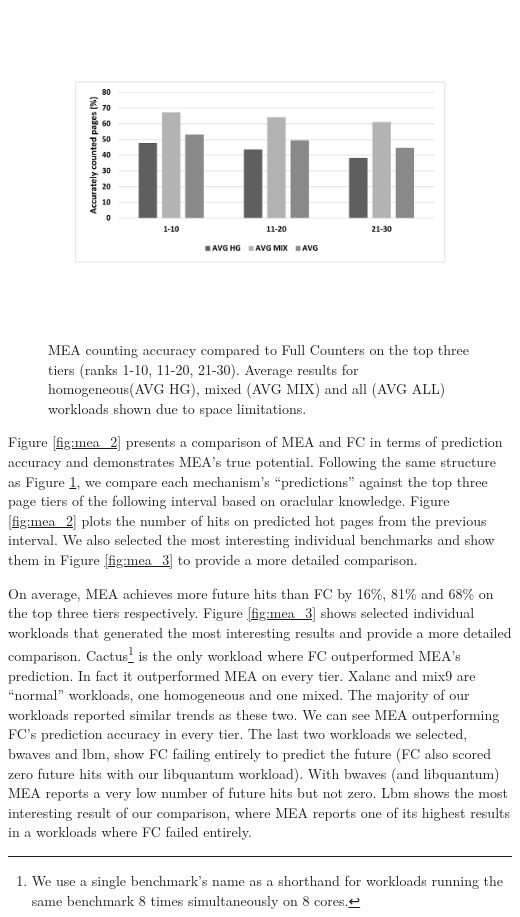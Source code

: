 \begin{figure}[t]
\centering
  \includegraphics[scale=.3]{figures/mea_1_v2.pdf}
  \caption{MEA counting accuracy compared to Full Counters on the top three tiers (ranks 1-10, 11-20, 21-30). Average results for homogeneous(AVG HG), mixed (AVG MIX) and all (AVG ALL) workloads shown due to space limitations.}
  \label{fig:mea_1}
\end{figure}

Figure \ref{fig:mea_2} presents a comparison of MEA and FC in terms of prediction accuracy and demonstrates MEA's true potential. Following the same structure as Figure \ref{fig:mea_1}, we compare each mechanism's ``predictions'' against the top three page tiers of the following interval based on oraclular knowledge. Figure \ref{fig:mea_2} plots the number of hits on predicted hot pages from the previous interval. We also selected the most interesting individual benchmarks and show them in Figure \ref{fig:mea_3} to provide a more detailed comparison. 

On average, MEA achieves more future hits than FC by 16\%, 81\% and 68\% on the top three tiers respectively. Figure \ref{fig:mea_3} shows selected individual workloads that generated the most interesting results and provide a more detailed comparison. Cactus\footnote{We use a single benchmark's name as a shorthand for workloads running the same benchmark 8 times simultaneously on 8 cores.} is the only workload where FC outperformed MEA's prediction. In fact it outperformed MEA on every tier. Xalanc and mix9 are ``normal'' workloads, one homogeneous and one mixed. The majority of our workloads reported similar trends as these two. We can see MEA outperforming FC's prediction accuracy in every tier. The last two workloads we selected, bwaves and lbm, show FC failing entirely to predict the future (FC also scored zero future hits with our libquantum workload). With bwaves (and libquantum) MEA reports a very low number of future hits but not zero. Lbm shows the most interesting result of our comparison, where MEA reports one of its highest results in a workloads where FC failed entirely.

